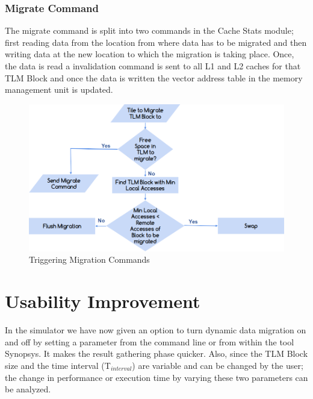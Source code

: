 \documentclass{listhesis}
\begin{document}
\subsubsection{Migrate Command}
The migrate command is split into two commands in the Cache Stats module; first reading data from the location from where data has to be migrated and then writing data at the new location to which the migration is taking place. Once, the data is read a invalidation command is sent to all L1 and L2 caches for that TLM Block and once the data is written the vector address table in the memory management unit is updated. \\
\begin{figure}
  \includegraphics[width=\linewidth]{tlmstats.png}
  \centering
  \caption{Triggering Migration Commands}
  \label{fig:tlm_stats flowchart}
\end{figure}
\section{Usability Improvement}
In the simulator we have now given an option to turn dynamic data migration on and off by setting a parameter from the command line or from within the tool Synopsys. It makes the result gathering phase quicker. Also, since the TLM Block size and the time interval (T$_{interval}$) are variable and can be changed by the user; the change in performance or execution time by varying these two parameters can be analyzed.
\end{document}
